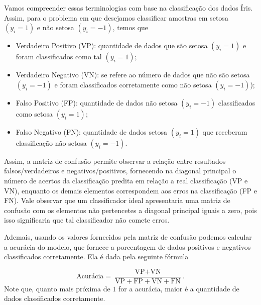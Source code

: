 \documentclass[12pt,a4paper]{scrartcl}
\theoremstyle{definition}%
\begin{document}
Vamos compreender essas terminologias com base na classificação dos
dados Íris. Assim, para o problema em que desejamos classificar amostras
em setosa $(y_{i} = 1)$ e não setosa $(y_{i} = -1)$, temos que

\begin{itemize}
\item
  Verdadeiro Positivo (VP): quantidade de dados que são setosa
  $(y_{i} = 1)$ e foram classificados como tal $(y_{i} = 1)$;
\item
  Verdadeiro Negativo (VN): se refere ao número de dados que não são
  setosa $(y_{i} = -1)$ e foram classificados corretamente como não
  setosa $(y_{i} = -1)$);
\item
  Falso Positivo (FP): quantidade de dados não setosa $(y_{i} = -1)$
  classificados como setosa $(y_{i} = 1)$;
\item
  Falso Negativo (FN): quantidade de dados setosa $(y_{i} = 1)$ que
  receberam classificação não setosa $(y_{i} = -1)$.
\end{itemize}

Assim, a matriz de confusão permite observar a relação entre resultados
falsos/verdadeiros e negativos/positivos, fornecendo na diagonal
principal o número de acertos da classificação predita em relação a real
classificação (VP e VN), enquanto os demais elementos correspondem aos
erros na classificação (FP e FN). Vale observar que um classificador
ideal apresentaria uma matriz de confusão com os elementos não
pertencetes a diagonal principal iguais a zero, pois isso significaria
que tal classificador não comete erros.

Ademais, usando os valores fornecidos pela matriz de confusão podemos
calcular a acurácia do modelo, que fornece a porcentagem de dados
positivos e negativos classificados corretamente. Ela é dada pela
seguinte fórmula

\[
\text{Acurácia} = \dfrac{\text{VP} + \text{VN}}{\text{VP} + \text{FP} + \text{VN} + \text{FN}} .
\]
Note que, quanto mais próxima de $1$ for a acurácia, maior é a quantidade de dados classificados corretamente.
\end{document}
